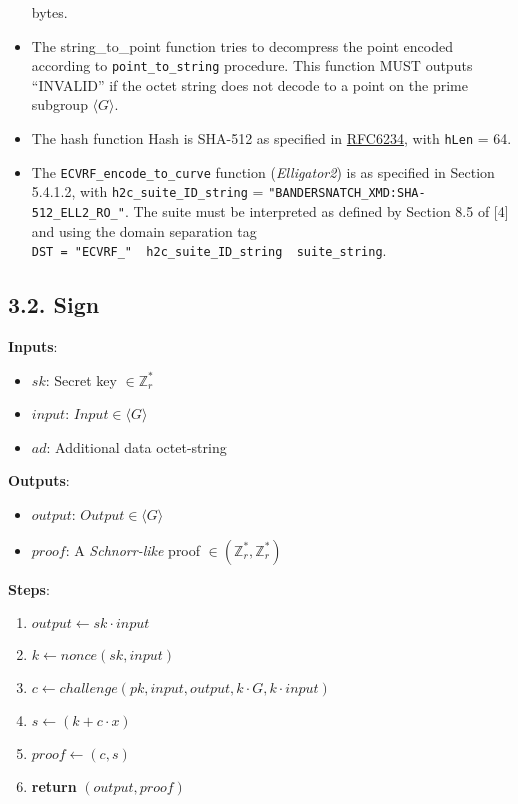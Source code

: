 \documentclass[
]{article}
\providecommand{\tightlist}{%
  \setlength{\itemsep}{0pt}\setlength{\parskip}{0pt}}
\begin{document}
\begin{itemize}
  bytes.
\item
  The string\_to\_point function tries to decompress the point encoded
  according to \texttt{point\_to\_string} procedure. This function MUST
  outputs ``INVALID'' if the octet string does not decode to a point on
  the prime subgroup \(\langle G \rangle\).
\item
  The hash function Hash is SHA-512 as specified in
  \href{https://www.rfc-editor.org/rfc/rfc6234}{RFC6234}, with
  \texttt{hLen} = 64.
\item
  The \texttt{ECVRF\_encode\_to\_curve} function (\emph{Elligator2}) is
  as specified in Section 5.4.1.2, with \texttt{h2c\_suite\_ID\_string}
  = \texttt{"BANDERSNATCH\_XMD:SHA-512\_ELL2\_RO\_"}. The suite must be
  interpreted as defined by Section 8.5 of {[}4{]} and using the domain
  separation tag
  \texttt{DST\ =\ "ECVRF\_"\ \textbar{}\textbar{}\ h2c\_suite\_ID\_string\ \textbar{}\textbar{}\ suite\_string}.
\end{itemize}

\hypertarget{sign}{%
\subsection{3.2. Sign}\label{sign}}

\textbf{Inputs}:

\begin{itemize}
\tightlist
\item
  \(sk\): Secret key \(\in \mathbb{Z}^*_r\)
\item
  \(input\): \(Input \in \langle G \rangle\)
\item
  \(ad\): Additional data octet-string
\end{itemize}

\textbf{Outputs}:

\begin{itemize}
\tightlist
\item
  \(output\): \(Output \in \langle G \rangle\)
\item
  \(proof\): A \emph{Schnorr-like} proof
  \(\in (\mathbb{Z}^*_r, \mathbb{Z}^*_r)\)
\end{itemize}

\textbf{Steps}:

\begin{enumerate}
\def\labelenumi{\arabic{enumi}.}
\tightlist
\item
  \(output \leftarrow sk \cdot input\)
\item
  \(k \leftarrow nonce(sk, input)\)
\item
  \(c \leftarrow challenge(pk, input, output, k \cdot G, k \cdot input)\)
\item
  \(s \leftarrow (k + c \cdot x)\)
\item
  \(proof \leftarrow (c, s)\)
\item
  \textbf{return} \((output, proof)\)
\end{enumerate}
\end{document}
